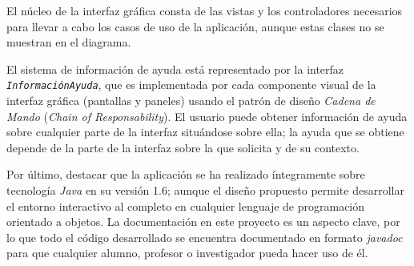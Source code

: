 El núcleo de la interfaz gráfica consta de las vistas y los controladores necesarios para llevar a cabo los casos de uso de la aplicación, aunque estas clases no se muestran en el diagrama.

El sistema de información de ayuda está representado por la interfaz \texttt{\textit{InformaciónAyuda}}, que es implementada por cada componente visual de la interfaz gráfica (pantallas y paneles) usando el patrón de diseño \textit{Cadena de Mando} (\textit{Chain of Responsability}).
El usuario puede obtener información de ayuda sobre cualquier parte de la interfaz situándose sobre ella; la ayuda que se obtiene depende de la parte de la interfaz sobre la que solicita y de su contexto.

Por último, destacar que la aplicación se ha realizado íntegramente sobre tecnología \textit{Java}  en su versión 1.6; aunque el diseño propuesto permite desarrollar el entorno interactivo al completo en cualquier lenguaje de programación orientado a objetos.
La documentación en este proyecto es un aspecto clave, por lo que todo el código desarrollado se encuentra documentado en formato \textit{javadoc} para que cualquier alumno, profesor o investigador pueda hacer uso de él.

